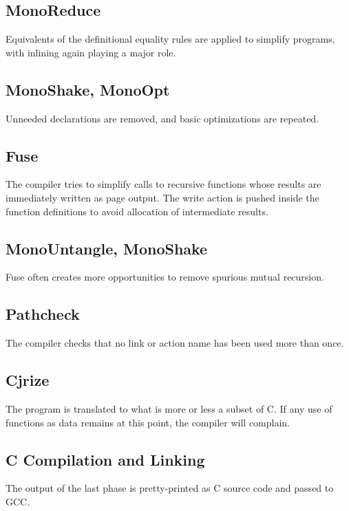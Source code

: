 \documentclass{article}
\begin{document}
\subsection{MonoReduce}

Equivalents of the definitional equality rules are applied to simplify programs, with inlining again playing a major role.

\subsection{MonoShake, MonoOpt}

Unneeded declarations are removed, and basic optimizations are repeated.

\subsection{Fuse}

The compiler tries to simplify calls to recursive functions whose results are immediately written as page output.  The write action is pushed inside the function definitions to avoid allocation of intermediate results.

\subsection{MonoUntangle, MonoShake}

Fuse often creates more opportunities to remove spurious mutual recursion.

\subsection{Pathcheck}

The compiler checks that no link or action name has been used more than once.

\subsection{Cjrize}

The program is translated to what is more or less a subset of C.  If any use of functions as data remains at this point, the compiler will complain.

\subsection{C Compilation and Linking}

The output of the last phase is pretty-printed as C source code and passed to GCC.
\end{document}
